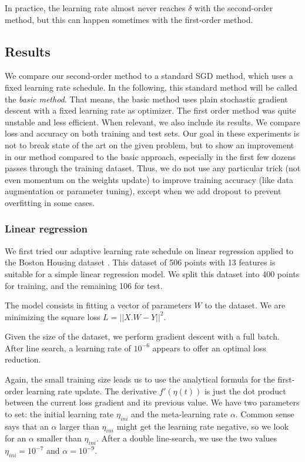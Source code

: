 \documentclass{article}
\begin{document}
  In practice, the learning rate almost never reaches $\delta$ with the second-order method, but this can happen sometimes with the first-order method. 
  
  \subsection{Results} 
  
  We compare our second-order method to a standard SGD method, which uses a fixed learning rate schedule. In the following, this standard method will be called the \emph{basic method}. That means, the basic method uses plain stochastic gradient descent with a fixed learning rate as optimizer. The first order method was quite unstable and less efficient. When relevant, we also include its results. We compare loss and accuracy on both training and test sets. Our goal in these experiments is not to break state of the art on the given problem, but to show an improvement in our method compared to the basic approach, especially in the first few dozens passes through the training dataset. Thus, we do not use any particular trick (not even momentum on the weights update) to improve training accuracy (like data augmentation or parameter tuning), except when we add dropout to prevent overfitting in some cases.  
  
  \subsubsection{Linear regression}
  
  We first tried our adaptive learning rate schedule on linear regression applied to the Boston Housing dataset \cite{boston}. This dataset of 506 points with 13 features is suitable for a simple linear regression model. We split this dataset into 400 points for training, and the remaining 106 for test.
  
  The model consists in fitting a vector of parameters $W$ to the dataset. We are minimizing the square loss $L=||X.W-Y||^{2}$.
  
  Given the size of the dataset, we perform gradient descent with a full batch. After line search, a learning rate of $10^{-6}$ appears to offer an optimal loss reduction. 
  
  Again, the small training size leads us to use the analytical formula for the first-order learning rate update. The derivative $f'(\eta(t))$ is just the dot product between the current loss gradient and its previous value. We have two parameters to set: the initial learning rate $\eta_{ini}$ and the meta-learning rate $\alpha$. Common sense says that an $\alpha$ larger than $\eta_{ini}$ might get the learning rate negative, so we look for an $\alpha$ smaller than $\eta_{ini}$. After a double line-search, we use the two values $\eta_{ini} = 10^{-7}$ and $\alpha = 10^{-9}$. 
  
\end{document}
